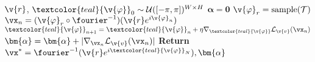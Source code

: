 \begin{algorithm}[H]
\caption{\magfv}\label{alg:maco:cap}
\begin{algorithmic}
  \REQUIRE $\v{r}$, $\textcolor{teal}{\v{\varphi}}_0 \sim \mathcal{U}([-\pi, \pi])^{W \times H}$
  \REQUIRE $\bm{\alpha} = \bm{0}$
    \STATE $\v{\varphi}_r = \text{sample}(\mathcal{T})$
    \STATE $\vx_n = (\v{\varphi}_r \circ \fourier^{-1})(\v{r} e^{i \v{\varphi}_n})$
    \STATE $\textcolor{teal}{\v{\varphi}}_{n+1} = \textcolor{teal}{\v{\varphi}}_n + \eta \nabla_{\textcolor{teal}{\v{\varphi}}} \mathcal{L}_{\v{v}}(\vx_n)$
    \STATE $\bm{\alpha} = \bm{\alpha} + |\nabla_{\vx_n} \mathcal{L}_{\v{v}}(\vx_n)|$
  \ENDFOR
  \STATE \textbf{Return} $\vx^* = \fourier^{-1}(\v{r} e^{i\textcolor{teal}{\v{\varphi}}_{N}}), \bm{\alpha}$
\end{algorithmic}
\end{algorithm}
